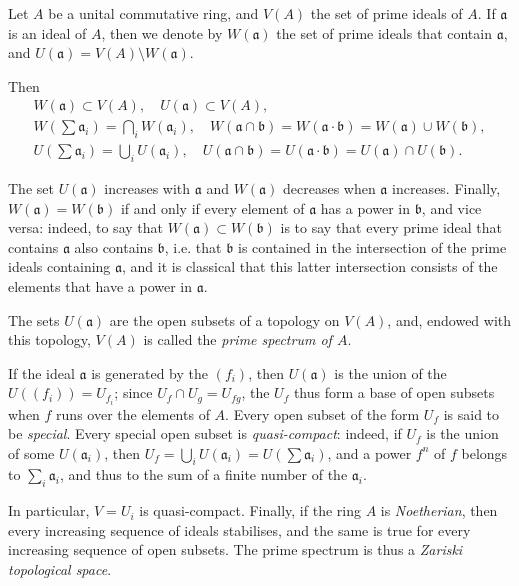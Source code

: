 \documentclass{article}
\theoremstyle{plain}
\newcommand{\oldpage}[1]{\marginpar{\footnotesize$\Big\vert$ \textit{p.~#1}}}
\begin{document}
Let $A$ be a unital commutative ring, and $V(A)$ the set of prime ideals of $A$.
If $\mathfrak{a}$ is an ideal of $A$, then we denote by $W(\mathfrak{a})$ the set of prime ideals that contain $\mathfrak{a}$, and $U(\mathfrak{a})=V(A)\setminus W(\mathfrak{a})$.

Then
\begin{gather*}
  W(\mathfrak{a}) \subset V(A), \quad U(\mathfrak{a})\subset V(A),
\\W(\sum\mathfrak{a}_i) = \bigcap_i W(\mathfrak{a}_i),
\quad W(\mathfrak{a}\cap\mathfrak{b}) = W(\mathfrak{a}\cdot\mathfrak{b}) = W(\mathfrak{a})\cup W(\mathfrak{b}),
\\U(\sum\mathfrak{a}_i) = \bigcup_i U(\mathfrak{a}_i),
\quad U(\mathfrak{a}\cap\mathfrak{b}) = U(\mathfrak{a}\cdot\mathfrak{b}) = U(\mathfrak{a})\cap U(\mathfrak{b}).
\end{gather*}

The set $U(\mathfrak{a})$ increases with $\mathfrak{a}$ and $W(\mathfrak{a})$ decreases when $\mathfrak{a}$ increases.
Finally, $W(\mathfrak{a})=W(\mathfrak{b})$ if and only if every element of $\mathfrak{a}$ has a power in $\mathfrak{b}$, and vice versa:
indeed, to say that $W(\mathfrak{a})\subset W(\mathfrak{b})$ is to say that every prime ideal that contains $\mathfrak{a}$ also contains $\mathfrak{b}$, i.e. that $\mathfrak{b}$ is contained in the intersection of the prime ideals containing $\mathfrak{a}$, and it is classical that this latter intersection consists of the elements that have a power in $\mathfrak{a}$.

The sets $U(\mathfrak{a})$ are the open subsets of a topology on $V(A)$, and, endowed with this topology, $V(A)$ is called the \emph{prime spectrum of $A$}.

If the ideal $\mathfrak{a}$ is generated by the $(f_i)$, then $U(\mathfrak{a})$ is the union of the $U((f_i))=U_{f_i}$;
since $U_f\cap U_g=U_{fg}$, the $U_f$ thus form a base of open subsets when $f$ runs over the elements of $A$.
Every open subset of the form $U_f$ is said to be \emph{special}.
Every special open subset is \emph{quasi-compact}:
indeed, if $U_f$ is the union of some $U(\mathfrak{a}_i)$, then $U_f=\bigcup_i U(\mathfrak{a}_i)=U(\sum\mathfrak{a}_i)$, and a power $f^n$ of $f$ belongs to $\sum_i\mathfrak{a}_i$, and thus to the sum of a finite number of the $\mathfrak{a}_i$.

In particular, $V=U_i$ is quasi-compact.
Finally, if the ring $A$ is \emph{Noetherian}, then every increasing sequence of ideals stabilises, and the same is true for every
\oldpage{1-04}
increasing sequence of open subsets.
The prime spectrum is thus a \emph{Zariski topological space}.
\end{document}
